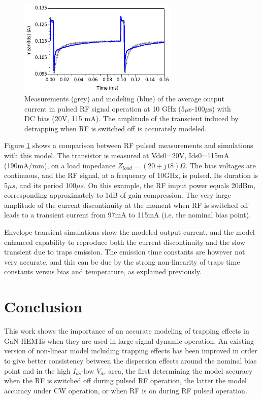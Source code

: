\documentclass[conference]{IEEEtran}
\begin{document}
\begin{figure}[ht!] %
\centering
\includegraphics[width=3.0in]{Compare_pulse.pdf}
\caption{Measurements (grey) and modeling (blue) of the average output current in pulsed RF signal operation at 10 GHz (5$\mu$s-100$\mu$s) with DC bias (20V, 115 mA). The amplitude of the transcient induced by detrapping when RF is switched off is accurately modeled.}
\label{Compare_pulse}
\end{figure}

Figure \ref{Compare_pulse} shows a comparison between RF pulsed measurements and simulations with this model. The transistor is measured at Vds0=20V, Ids0=115mA (190mA/mm), on a load impedance $Z_{load}=\left(20+j18\right)\Omega$. The bias voltages are continuous, and the RF signal, at a frequency of 10GHz, is pulsed. Its duration is 5$\mu s$, and its period 100$\mu s$. On this example, the RF imput power equals 20dBm, corresponding approximately to 1dB of gain compression. The very large amplitude of the current discontinuity at the moment when RF is switched off leads to a transient current from 97mA to 115mA (i.e. the nominal bias point). 

Envelope-transient simulations show the modeled output current, and the model enhanced capability to reproduce both the current discontinuity and the slow transient due to traps emission. The emission time constants are however not very accurate, and this can be due by the strong non-linearity of traps time constants versus bias and temperature, as explained previously.



\section{Conclusion}
This work shows the importance of an accurate modeling of trapping effects in GaN HEMTs when they are used in large signal dynamic operation. An existing version of non-linear model including trapping effects has been improved in order to give better consistency between the dispersion effects around the nominal bias point and in the high $I_{ds}$-low $V_{ds}$ area, the first determining the model accuracy when the RF is switched off during pulsed RF operation, the latter the model accuracy under CW operation, or when RF is on during RF pulsed operation. 
\end{document}
